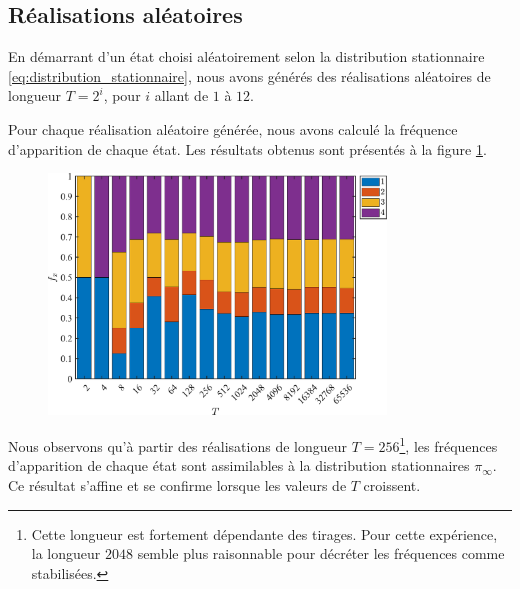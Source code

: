 \documentclass[a4paper, 12pt]{report}
\begin{document}
    \subsection{Réalisations aléatoires}
    En démarrant d'un état choisi aléatoirement selon la distribution stationnaire \eqref{eq:distribution_stationnaire}, nous avons générés des réalisations aléatoires de longueur $T = 2^i$, pour $i$ allant de $1$ à $12$.\par
    Pour chaque réalisation aléatoire générée, nous avons calculé la fréquence d'apparition de chaque état. Les résultats obtenus sont présentés à la figure \ref{fig:stationnaire}.\par
    \begin{figure}[H]
        \centering
        \includegraphics[width=0.8\textwidth]{resources/pdf/frequency.pdf}
        \label{fig:stationnaire}
    \end{figure}
    Nous observons qu'à partir des réalisations de longueur $T = 256$\footnote{Cette longueur est fortement dépendante des tirages. Pour cette expérience, la longueur $2048$ semble plus raisonnable pour décréter les fréquences comme stabilisées.}, les fréquences d'apparition de chaque état sont assimilables à la distribution stationnaires $\pi_\infty$. Ce résultat s'affine et se confirme lorsque les valeurs de $T$ croissent.
\end{document}
